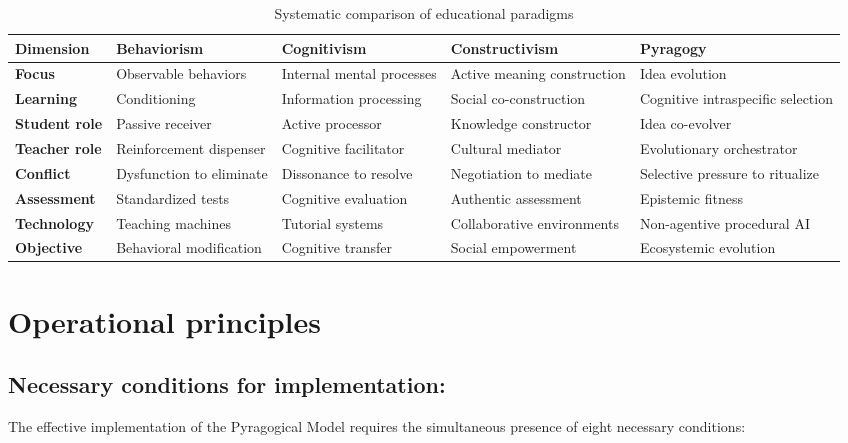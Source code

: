 \vspace{1cm}

\begin{table}[H]
	\centering
	\caption{Systematic comparison of educational paradigms}
	\label{tab:paradigm-comparison}
	\begin{tabularx}{\textwidth}{p{2.5cm}X X X X}
		\toprule
		\textbf{Dimension} & \textbf{Behaviorism} & \textbf{Cognitivism} & \textbf{Constructivism} & \textbf{Pyragogy} \\
		\midrule
		\textbf{Focus} & Observable behaviors & Internal mental processes & Active meaning construction & Idea evolution \\
		\textbf{Learning} & Conditioning & Information processing & Social co-construction & Cognitive intraspecific selection \\
		\textbf{Student role} & Passive receiver & Active processor & Knowledge constructor & Idea co-evolver \\
		\textbf{Teacher role} & Reinforcement dispenser & Cognitive facilitator & Cultural mediator & Evolutionary orchestrator \\
		\textbf{Conflict} & Dysfunction to eliminate & Dissonance to resolve & Negotiation to mediate & Selective pressure to ritualize \\
		\textbf{Assessment} & Standardized tests & Cognitive evaluation & Authentic assessment & Epistemic fitness \\
		\textbf{Technology} & Teaching machines & Tutorial systems & Collaborative environments & Non-agentive procedural AI \\
		\textbf{Objective} & Behavioral modification & Cognitive transfer & Social empowerment & Ecosystemic evolution \\
		\bottomrule
	\end{tabularx}
\end{table}

\newpage

\section{Operational principles}
\subsection*{Necessary conditions for implementation:}

The effective implementation of the Pyragogical Model requires the simultaneous presence of eight necessary conditions:

